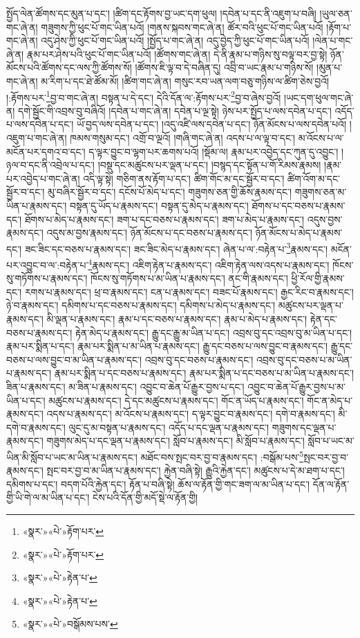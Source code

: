 སྤྱོད་ལེན་ཚོགས་དང་མུན་པ་དང་། །ཚིག་དང་རྟོགས་བྱ་ཡང་དག་ཕུལ། །དབེན་པ་དང་ནི་འཇུག་པ་བཞི། །ཡུལ་ཅན་གང་ཞེ་ན། གཟུགས་ཀྱི་ཕུང་པོ་གང་ཡིན་པའོ། །གནས་སྐབས་གང་ཞེ་ན། ཚོར་བའི་ཕུང་པོ་གང་ཡིན་པའོ། །རྟོག་པ་གང་ཞེ་ན། འདུ་ཤེས་ཀྱི་ཕུང་པོ་གང་ཡིན་པའོ། །སྤྱོད་པ་གང་ཞེ་ན། འདུ་བྱེད་ཀྱི་ཕུང་པོ་གང་ཡིན་པའོ། །ལེན་པ་གང་ཞེ་ན། རྣམ་པར་ཤེས་པའི་ཕུང་པོ་གང་ཡིན་པའོ། །ཚོགས་གང་ཞེ་ན། དེ་ནི་རྣམ་པ་གཉིས་སུ་བལྟ་བར་བྱ་སྟེ། ཉོན་མོངས་པའི་ཚོགས་དང་ལས་ཀྱི་ཚོགས་སོ། །ཚོགས་ཇི་ལྟ་བ་དེ་བཞིན་དུ། འབྲི་བ་ཡང་རྣམ་པ་གཉིས་སོ། །མུན་པ་གང་ཞེ་ན། མ་རིག་པ་དང་ཐེ་ཚོམ་མོ། །ཚིག་གང་ཞེ་ན། གསུང་རབ་ཡན་ལག་བཅུ་གཉིས་ལ་ཚིག་ཅེས་བྱའོ། །:རྟོགས་པར་\footnote{«སྣར་»«པེ་»རྟོག་པར་}བྱ་བ་གང་ཞེ་ན། བསྟན་པ་དེ་དང་། དེའི་དོན་ལ་:རྟོགས་པར་\footnote{«སྣར་»«པེ་»རྟོག་པར་}བྱ་བ་ཞེས་བྱའོ། །ཡང་དག་ཕུལ་གང་ཞེ་ན། དགེ་སྦྱོང་གི་འབྲས་བུ་བཞིའོ། །དབེན་པ་གང་ཞེ་ན། དབེན་པ་ལྔ་སྟེ། ཉེས་པར་སྤྱོད་པ་ལས་དབེན་པ་དང་། འདོད་པ་ལས་དབེན་པ་དང་། ཡོ་བྱད་ལས་དབེན་པ་དང་། །འདུ་འཛི་ལས་དབེན་པ་དང་། ཉོན་མོངས་པ་ལས་དབེན་པའོ། །འཇུག་པ་གང་ཞེ་ན། ཁམས་གསུམ་དང་། འགྲོ་བ་ལྔའོ། །གཞི་གང་ཞེ་ན། འདས་པ་ལ་ལྟ་བ་དང་། མ་འོངས་པ་ལ་མངོན་པར་དགའ་བ་དང་། ད་ལྟར་བྱུང་བ་ལྷག་པར་ཆགས་པའོ། །སྡོམ་ལ། རྣམ་པར་འབྱེད་དང་ཀུན་དུ་འབྱུང་། །ཉལ་བ་དང་ནི་འབྲེལ་པ་དང་། །བསྡུ་དང་མཚུངས་པར་ལྡན་པ་དང་། །བསྙད་དང་སྟོན་པ་གོ་རིམས་རྣམས། །རྣམ་པར་འབྱེད་པ་གང་ཞེ་ན། འདི་ལྟ་སྟེ། གཅིག་ནས་རྟོག་པ་དང་། ཚིག་གོང་མ་དང་སྦྱོར་བ་དང་། ཚིག་འོག་མ་དང་སྦྱོར་བ་དང་། མུ་བཞིར་སྦྱོར་བ་དང་། དངོས་པོ་མེད་པ་དང་། གཟུགས་ཅན་གྱི་ཆོས་རྣམས་དང་། གཟུགས་ཅན་མ་ཡིན་པ་རྣམས་དང་། བསྟན་དུ་ཡོད་པ་རྣམས་དང་། བསྟན་དུ་མེད་པ་རྣམས་དང་། ཐོགས་པ་དང་བཅས་པ་རྣམས་དང་། ཐོགས་པ་མེད་པ་རྣམས་དང་། ཟག་པ་དང་བཅས་པ་རྣམས་དང་། ཟག་པ་མེད་པ་རྣམས་དང་། འདུས་བྱས་རྣམས་དང་། འདུས་མ་བྱས་རྣམས་དང་། ཉོན་མོངས་པ་དང་བཅས་པ་རྣམས་དང་། ཉོན་མོངས་པ་མེད་པ་རྣམས་དང་། ཟང་ཟིང་དང་བཅས་པ་རྣམས་དང་། ཟང་ཟིང་མེད་པ་རྣམས་དང་། ཞེན་པ་ལ་:བརྟེན་པ་\footnote{«སྣར་»«པེ་»རྟེན་པ་}རྣམས་དང་། མངོན་པར་འབྱུང་བ་ལ་:བརྟེན་པ་\footnote{«སྣར་»«པེ་»རྟེན་པ་}རྣམས་དང་། འཇིག་རྟེན་པ་རྣམས་དང་། འཇིག་རྟེན་ལས་འདས་པ་རྣམས་དང་། ཁོངས་སུ་གཏོགས་པ་རྣམས་དང་། ཁོངས་སུ་གཏོགས་པ་མ་ཡིན་པ་རྣམས་དང་། ནང་གི་རྣམས་དང་། ཕྱི་རོལ་གྱི་རྣམས་དང་། རགས་པ་རྣམས་དང་། ཕྲ་བ་རྣམས་དང་། ངན་པ་རྣམས་དང་། བཟང་པོ་རྣམས་དང་། རྒྱང་རིང་བ་རྣམས་དང་། ཉེ་བ་རྣམས་དང་། དམིགས་པ་དང་བཅས་པ་རྣམས་དང་། དམིགས་པ་མེད་པ་རྣམས་དང་། མཚུངས་པར་ལྡན་པ་རྣམས་དང་། མི་ལྡན་པ་རྣམས་དང་། རྣམ་པ་དང་བཅས་པ་རྣམས་དང་། རྣམ་པ་མེད་པ་རྣམས་དང་། རྟེན་དང་བཅས་པ་རྣམས་དང་། རྟེན་མེད་པ་རྣམས་དང་། རྒྱུ་དང་རྒྱུ་མ་ཡིན་པ་དང་། འབྲས་བུ་དང་འབྲས་བུ་མ་ཡིན་པ་དང་། རྣམ་པར་སྨིན་པ་དང་། རྣམ་པར་སྨིན་པ་མ་ཡིན་པ་རྣམས་དང་། རྒྱུ་དང་བཅས་པ་ལས་བྱུང་བ་རྣམས་དང་། རྒྱུ་དང་བཅས་པ་ལས་བྱུང་བ་མ་ཡིན་པ་རྣམས་དང་། འབྲས་བུ་དང་བཅས་པ་རྣམས་དང་། འབྲས་བུ་དང་བཅས་པ་མ་ཡིན་པ་རྣམས་དང་། རྣམ་པར་སྨིན་པ་དང་བཅས་པ་རྣམས་དང་། རྣམ་པར་སྨིན་པ་དང་བཅས་པ་མ་ཡིན་པ་རྣམས་དང་། ཟིན་པ་རྣམས་དང་། མ་ཟིན་པ་རྣམས་དང་། འབྱུང་བ་ཆེན་པོ་རྒྱུར་བྱས་པ་དང་། འབྱུང་བ་ཆེན་པོ་རྒྱུར་བྱས་པ་མ་ཡིན་པ་དང་། མཚུངས་པ་རྣམས་དང་། དེ་དང་མཚུངས་པ་རྣམས་དང་། གོང་ན་ཡོད་པ་རྣམས་དང་། གོང་ན་མེད་པ་རྣམས་དང་། འདས་པ་རྣམས་དང་། མ་འོངས་པ་རྣམས་དང་། ད་ལྟར་བྱུང་བ་རྣམས་དང་། དགེ་བ་རྣམས་དང་། མི་དགེ་བ་རྣམས་དང་། ལུང་དུ་མ་བསྟན་པ་རྣམས་དང་། འདོད་པ་དང་ལྡན་པ་རྣམས་དང་། གཟུགས་དང་ལྡན་པ་རྣམས་དང་། གཟུགས་མེད་པ་དང་ལྡན་པ་རྣམས་དང་། སློབ་པ་རྣམས་དང་། མི་སློབ་པ་རྣམས་དང་། སློབ་པ་ཡང་མ་ཡིན་མི་སློབ་པ་ཡང་མ་ཡིན་པ་རྣམས་དང་། མཐོང་བས་སྤང་བར་བྱ་བ་རྣམས་དང་། :བསྒོམ་པས་\footnote{«སྣར་»«པེ་»བསྒོམས་པས་}སྤང་བར་བྱ་བ་རྣམས་དང་། སྤང་བར་བྱ་བ་མ་ཡིན་པ་རྣམས་དང་། རྐྱེན་བཞི་སྟེ། རྒྱུའི་རྐྱེན་དང་། མཚུངས་པ་དེ་མ་ཐག་པ་དང་། དམིགས་པ་དང་། བདག་པོའི་རྐྱེན་དང་། རྟོན་པ་བཞི་སྟེ། ཆོས་ལ་རྟོན་གྱི་གང་ཟག་ལ་མ་ཡིན་པ་དང་། དོན་ལ་རྟོན་གྱི་ཡི་གེ་ལ་མ་ཡིན་པ་དང་། ངེས་པའི་དོན་གྱི་མདོ་སྡེ་ལ་རྟོན་གྱི། 